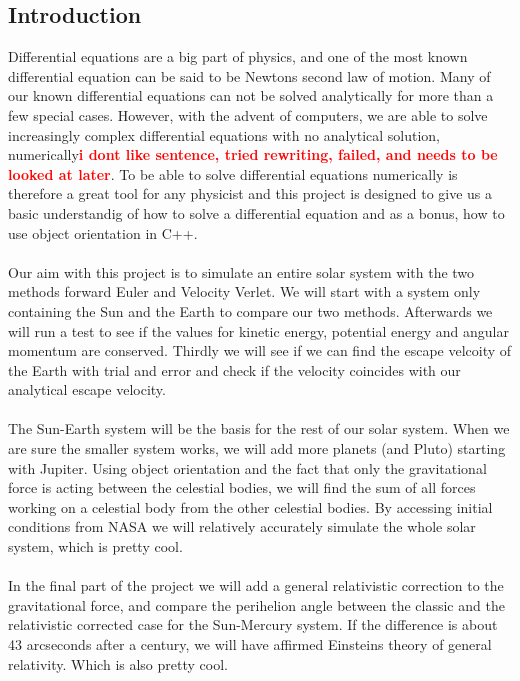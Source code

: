\documentclass{article}
\newcommand\red[1]{\textcolor{red}{\textbf{#1}}}
\begin{document}
\subsection{Introduction}
Differential equations are a big part of physics, and one of the most known differential equation can be said to be Newtons second law of motion. Many of our known differential equations can not be solved analytically for more than a few special cases. However, with the advent of computers, we are able to solve increasingly complex differential equations with no analytical solution, numerically\red{i dont like sentence, tried rewriting, failed, and needs to be looked at later}. To be able to solve differential equations numerically is therefore a great tool for any physicist and this project is designed to give us a basic understandig of how to solve a differential equation and as a bonus, how to use object orientation in C++. \\ \\
Our aim with this project is to simulate an entire solar system with the two methods forward Euler and Velocity Verlet. We will start with a system only containing the Sun and the Earth to compare our two methods. Afterwards we will run a test to see if the values for kinetic energy, potential energy and angular momentum are conserved. Thirdly we will see if we can find the escape velcoity of the Earth with trial and error and check if the velocity coincides with our analytical escape velocity. \\\\
The Sun-Earth system will be the basis for the rest of our solar system. When we are sure the smaller system works, we will add more planets (and Pluto) starting with Jupiter. Using object orientation and the fact that only the gravitational force is acting between the celestial bodies, we will find the sum of all forces working on a celestial body from the other celestial bodies. By accessing initial conditions from NASA we will relatively accurately simulate the whole solar system, which is pretty cool. \\\\
In the final part of the project we will add a general relativistic correction to the gravitational force, and compare the perihelion angle between the classic and the relativistic corrected case for the Sun-Mercury system. %
If the difference is about 43 arcseconds after a century, we will have affirmed Einsteins theory of general relativity. Which is also pretty cool.
\end{document}
